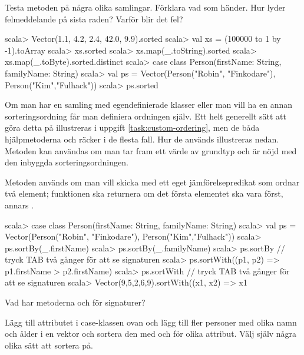 \Subtask Testa metoden  på några olika samlingar. Förklara vad som händer. Hur lyder felmeddelande på sista raden? Varför blir det fel?

\begin{REPL}
scala> Vector(1.1, 4.2, 2.4, 42.0, 9.9).sorted
scala> val xs = (100000 to 1 by -1).toArray
scala> xs.sorted
scala> xs.map(_.toString).sorted
scala> xs.map(_.toByte).sorted.distinct
scala> case class Person(firstName: String, familyName: String)
scala> val ps = Vector(Person("Robin", "Finkodare"), Person("Kim","Fulhack")) 
scala> ps.sorted
\end{REPL}	

\Subtask Om man har en samling med egendefinierade klasser eller man vill ha en annan sorteringsordning får man definiera ordningen själv. Ett helt generellt sätt att göra detta på  illustreras i uppgift \ref{task:custom-ordering}, men de båda hjälpmetoderna  och  räcker i de flesta fall. Hur de används illustreras nedan. Metoden  kan användas om man tar fram ett värde av grundtyp och är nöjd med den inbyggda sorteringsordningen. 

Metoden  används om man vill skicka med ett eget jämförelsepredikat som ordnar två element; funktionen ska returnera  om det första elementet ska vara först, annars .

\begin{REPL}
scala> case class Person(firstName: String, familyName: String)
scala> val ps = Vector(Person("Robin", "Finkodare"), Person("Kim","Fulhack")) 
scala> ps.sortBy(_.firstName)
scala> ps.sortBy(_.familyName)
scala> ps.sortBy  // tryck TAB två gånger för att se signaturen
scala> ps.sortWith((p1, p2) => p1.firstName > p2.firstName) 
scala> ps.sortWith  // tryck TAB två gånger för att se signaturen
scala> Vector(9,5,2,6,9).sortWith((x1, x2) => x1 %
\end{REPL}
Vad har metoderna  och  för signaturer? 

\Subtask Lägg till attributet  i case-klassen  ovan och lägg till fler personer med olika namn och ålder i en vektor och sortera den med  och  för olika attribut. Välj själv några olika sätt att sortera på. 




